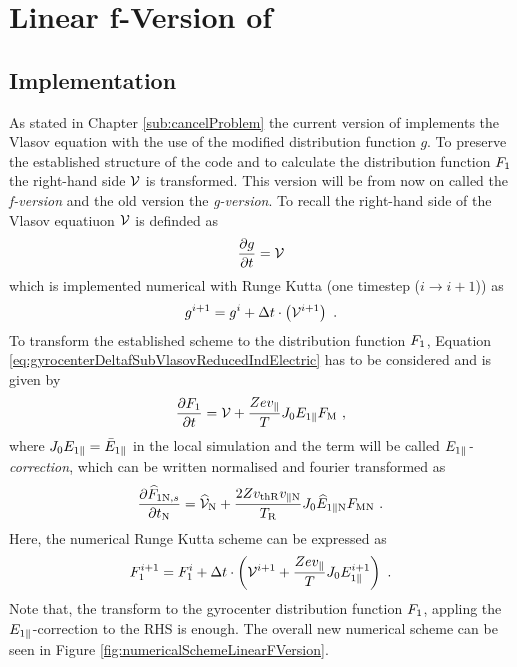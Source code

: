 \section{Linear f-Version of {\gkw}}
\label{sec:simLinearFVersion}

\subsection{Implementation}
\label{sub:implementationLinearFVersion}

As stated in Chapter \ref{sub:cancelProblem} the current version of {\gkw} implements the Vlasov equation with the use of the modified distribution function $g$. To preserve the established structure of the code and to calculate the distribution function $F_1$ the right-hand side $\mathcal{V}$ is transformed. This version will be from now on called the \textit{f-version} and the old version the \textit{g-version}. To recall the right-hand side of the Vlasov equatiuon $\mathcal{V}$ is definded as
\begin{gather}
    \frac{\partial g}{\partial t} = \mathcal{V}
    \label{eq:rightHandSideRecall}
\end{gather}
which is implemented numerical with Runge Kutta (one timestep ($i \rightarrow i+1$)) as
\begin{gather}
    g^{i+1} = g^{i} + \Delta t \cdot \left(\mathcal{V}^{i+1}\right) ~.
    \label{eq:numericalSchemeModifiedDistribution}
\end{gather}
To transform the established scheme to the distribution function $F_1$, Equation \ref{eq:gyrocenterDeltafSubVlasovReducedIndElectric} has to be considered and is given by
\begin{gather}
    \frac{\partial F_1}{\partial t} = \mathcal{V} + \frac{Ze v_\parallel}{T} J_0 E_{1\parallel} F_\mathrm{M}~,
    \label{eq:gyrocenterDeltafSubVlasovReducedIndElectricRecall}
\end{gather}
where $J_0 E_{1\parallel} = \bar{E}_{1\parallel}$ in the local simulation and the term will be called \textit{$E_{1\parallel}$-correction}, which can be written normalised and fourier transformed as 
\begin{gather}
    \frac{\partial \widehat{F}_{1\mathrm{N},s}}{\partial t_\mathrm{N}} = \widehat{\mathcal{V}}_\mathrm{N} + \frac{2 Z v_{\mathrm{th} \mathrm{R}} v_{\parallel \mathrm{N}}}{T_\mathrm{R}} J_0 \widehat{E}_{1\parallel \mathrm{N}} F_{\mathrm{M} \mathrm{N}}~.
    \label{eq:gyrocenterDeltafSubVlasovReducedIndElectricNorm}
\end{gather}
Here, the numerical Runge Kutta scheme can be expressed as
\begin{gather}
    F_1^{i+1} = F_1^{i} + \Delta t \cdot \left(\mathcal{V}^{i+1} + \frac{Ze v_\parallel}{T} J_0 E_{1\parallel}^{i+1} \right) ~.
    \label{eq:numericalSchemeModifiedDistribution}
\end{gather}
Note that, the transform to the gyrocenter distribution function $F_1$, appling the $E_{1\parallel}$-correction to the RHS is enough. The overall new numerical scheme can be seen in Figure \ref{fig:numericalSchemeLinearFVersion}.

